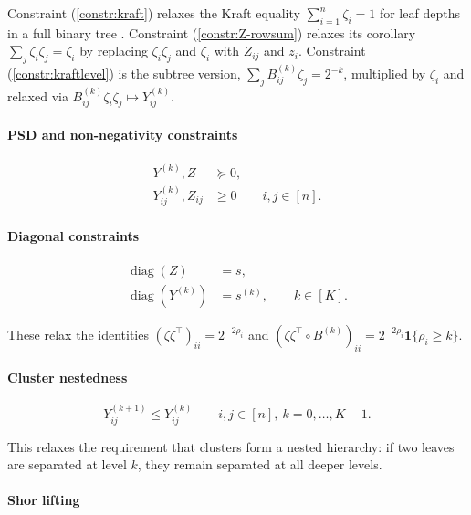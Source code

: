 \documentclass{article}
\begin{document}
Constraint (\ref{constr:kraft}) relaxes the Kraft equality
$\sum_{i=1}^n \zeta_i=1$ for leaf depths in a full binary tree
\cite{catanzaro2012balanced,cover1999elements}.
Constraint (\ref{constr:Z-rowsum}) relaxes its corollary
$\sum_{j}\zeta_i\zeta_j=\zeta_i$ by replacing
$\zeta_i\zeta_j$ and $\zeta_i$ with $Z_{ij}$ and $z_i$.
Constraint (\ref{constr:kraftlevel}) is the subtree version,
$\sum_j B^{(k)}_{ij}\zeta_j=2^{-k}$, multiplied by $\zeta_i$
and relaxed via $B^{(k)}_{ij}\zeta_i\zeta_j\mapsto Y^{(k)}_{ij}$.


\paragraph{PSD and non-negativity constraints}

\begin{align}
Y^{(k)},Z &\succeq 0, \label{eq:Y-psd}\\
Y^{(k)}_{ij}, Z_{ij} &\ge 0 \qquad i,j\in [n]. \label{eq:Y-nonneg}
\end{align}

\paragraph{Diagonal constraints}

\begin{align}
\operatorname{diag}(Z) &= s, \label{constr:diagZ} \\
\operatorname{diag}(Y^{(k)}) &= s^{(k)}, \qquad k\in[K]. \label{constr:diagY}
\end{align}

\noindent
These relax the identities
$(\zeta\zeta^{\top})_{ii}=2^{-2\rho_i}$ and
$(\zeta\zeta^{\top}\!\circ B^{(k)})_{ii}
=2^{-2\rho_i}\mathbf{1}\{\rho_i\ge k\}$.


\paragraph{Cluster nestedness}
\begin{equation}
Y^{(k+1)}_{ij} \le Y^{(k)}_{ij}
\qquad i,j\in [n],\ k=0,\dots,K-1.
\end{equation}

This relaxes the requirement that clusters form a nested hierarchy: if two leaves are separated at level $k$, they
remain separated at all deeper levels.


\paragraph{Shor lifting}
\end{document}
